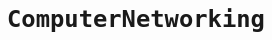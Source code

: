 \newpage
\chapter{\tt Computer\space Networking}
\thispagestyle{fancy}
\section[\tt TCP/IP]{\color{blue}{\tt TCP/IP}}%
\subsection[{\tt TCP/IP}协议中的三次握手和四次挥手]{}

